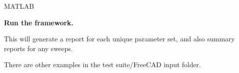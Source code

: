 \documentclass[11pt]{article}
\begin{document}
\begin{turn}{45}
\begin{minipage}{0.2\linewidth}
\textcolor[rgb]{0.50,0.50,1.00}{MATLAB}
\end{minipage}
\end{turn}
\begin{minipage}{0.8\linewidth}
\textbf{Run the framework.}

This will generate a report for each unique parameter set, and also summary reports for any sweeps.
\vspace{10mm}
\end{minipage}

There are other examples in the test suite/FreeCAD input folder.
\end{document}
